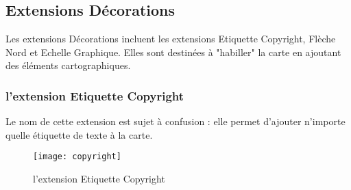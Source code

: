 
\subsection{Extensions D\'ecorations}


Les extensions D\'ecorations incluent les extensions Etiquette Copyright,
Fl\`eche Nord et Echelle Graphique. Elles sont destin\'ees \`a "habiller" la carte
en ajoutant des \'el\'ements cartographiques.

\subsubsection{l'extension Etiquette Copyright}

Le nom de cette extension est sujet \`a confusion : elle permet d'ajouter n'importe quelle \'etiquette de texte \`a la carte.

\begin{figure}[ht]
   \begin{center}
   \caption{l'extension Etiquette Copyright\nixcaption}\label{fig:copyright}\smallskip
   \texttt{[image: copyright]}
\end{center}
\end{figure}

